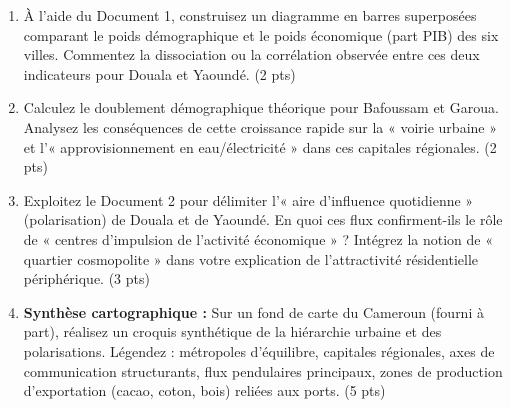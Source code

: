 \documentclass[11pt]{article}
\begin{document}
\begin{exercice}
\begin{enumerate}
    \item À l'aide du Document 1, construisez un diagramme en barres superposées comparant le poids démographique et le poids économique (part PIB) des six villes. Commentez la dissociation ou la corrélation observée entre ces deux indicateurs pour Douala et Yaoundé. (2 pts)
    \item Calculez le doublement démographique théorique pour Bafoussam et Garoua. Analysez les conséquences de cette croissance rapide sur la « voirie urbaine » et l'« approvisionnement en eau/électricité » dans ces capitales régionales. (2 pts)
    \item Exploitez le Document 2 pour délimiter l'« aire d'influence quotidienne » (polarisation) de Douala et de Yaoundé. En quoi ces flux confirment-ils le rôle de « centres d'impulsion de l'activité économique » ? Intégrez la notion de « quartier cosmopolite » dans votre explication de l'attractivité résidentielle périphérique. (3 pts)
    \item \textbf{Synthèse cartographique :} Sur un fond de carte du Cameroun (fourni à part), réalisez un croquis synthétique de la hiérarchie urbaine et des polarisations. Légendez : métropoles d'équilibre, capitales régionales, axes de communication structurants, flux pendulaires principaux, zones de production d'exportation (cacao, coton, bois) reliées aux ports. (5 pts)
\end{enumerate}
\end{exercice}
\end{document}
